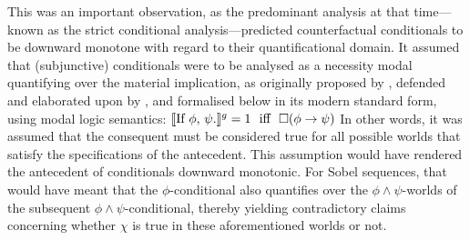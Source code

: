 This was an important observation, as the predominant analysis at that time---known as the strict conditional analysis---predicted counterfactual conditionals to be downward monotone with regard to their quantificational domain.  It assumed that (subjunctive) conditionals were to be analysed as a necessity modal quantifying over the material implication, as originally proposed by \textcite[p. 33]{Peirce1896}, defended and elaborated upon by \textcite{Lewis1912,Lewis1914,Lewis1918}, and formalised below in its modern standard form, using  modal logic semantics:
\ex{}$\llbracket\text{If $\phi$, $\psi$.}\rrbracket^{g}=1\text{~~iff~~}\square(\phi\rightarrow\psi)$
\xe
In other words, it was assumed that the consequent must be considered true for all possible worlds that satisfy the specifications of the antecedent. This assumption would have rendered the antecedent of conditionals downward monotonic. For Sobel sequences, that would have meant that the $\phi$-conditional also quantifies over the $\phi\land\psi$-worlds of the subsequent $\phi\land\psi$-conditional, thereby yielding contradictory claims concerning whether $\chi$ is true in these aforementioned worlds or not.
